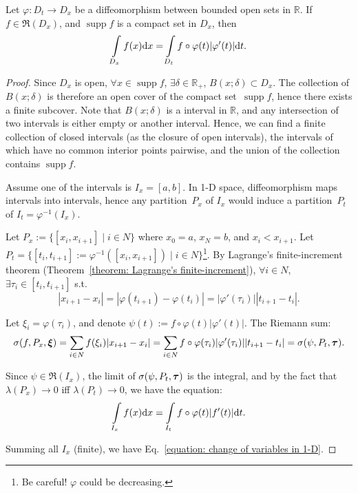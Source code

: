 \documentclass[openany]{book}
\DeclareMathOperator{\supp}{supp}
\begin{document}
\begin{theorem}
	\label{theorem: change of variables in 1-D}
	Let $\varphi \colon D_t \to D_x$ be a diffeomorphism between bounded open sets in $\mathbb R$.
	If $f \in \mathfrak R(D_x)$, and $\supp f$ is a compact set in $D_x$, then
	\begin{equation}
		\label{equation: change of variables in 1-D}
		\int\limits_{D_x} f(x) \mathrm{d} x = \int\limits_{D_t} f \circ \varphi(t) |\varphi'(t)|\mathrm{d} t.
	\end{equation}
\end{theorem}
\begin{proof}
	Since $D_x$ is open, $\forall x \in \supp f$, $\exists \delta \in \mathbb R_+$, $B(x; \delta) \subset D_x$. 
	The collection of $B(x; \delta)$ is therefore an open cover of the compact set~$\supp f$, hence there exists a finite subcover. 
	Note that $B(x; \delta)$ is a interval in $\mathbb R$, and any intersection of two intervals is either empty or another interval. 
	Hence, we can find a finite collection of closed intervals (as the closure of open intervals), the intervals of which have no common interior points pairwise, and the union of the collection contains $\supp f$.

	Assume one of the intervals is $I_x = [a, b]$. 
	In 1-D space, diffeomorphism maps intervals into intervals, hence any partition~$P_x$ of $I_x$ would induce a partition~$P_t$ of $I_t = \varphi^{-1}(I_x)$. 
	
	Let $P_x := \{[x_i, x_{i+1}] \mid i \in N\}$ where $x_0 = a$, $x_{N} = b$, and $x_i < x_{i+1}$. 
	Let $P_t = \{[t_i, t_{i+1}] := \varphi^{-1}([x_i, x_{i+1}]) \mid i \in N\}$\footnote{Be careful! $\varphi$ could be decreasing.}.
	By Lagrange's finite-increment theorem (Theorem~\ref{theorem: Lagrange's finite-increment}), $\forall i \in N$, $\exists \tau_i \in [t_i, t_{i+1}]$ s.t.\ 
	\begin{equation*}
		|x_{i+1} - x_i| = |\varphi(t_{i+1}) - \varphi(t_i)| 
			= |\varphi'(\tau_i)| |t_{i+1} - t_i|.
	\end{equation*}

	Let $\xi_i = \varphi(\tau_i)$, and denote $\psi(t) := f \circ \varphi(t)|\varphi'(t)|$. The Riemann sum:
	\begin{equation*}
		\sigma(f, P_x, \boldsymbol{\xi}) = \sum_{i \in N} f(\xi_i)|x_{i+1} - x_i| 
			= \sum_{i \in N} f \circ \varphi(\tau_i) |\varphi'(\tau_i)||t_{i+1} - t_i|
			= \sigma(\psi, P_t, \boldsymbol{\tau}).
	\end{equation*}

	Since $\psi \in \mathfrak R(I_x)$, the limit of $\sigma(\psi, P_t, \boldsymbol{\tau})$ is the integral, and by the fact that $\lambda(P_x) \to 0$ iff $\lambda(P_t) \to 0$, we have the equation:
	\begin{equation*}
		\int\limits_{I_x} f(x) \mathrm{d} x = \int\limits_{I_t} f \circ \varphi(t) |f'(t)|\mathrm{d} t.
	\end{equation*} 

	Summing all $I_x$ (finite), we have Eq.~\ref{equation: change of variables in 1-D}.
\end{proof}
\end{document}
